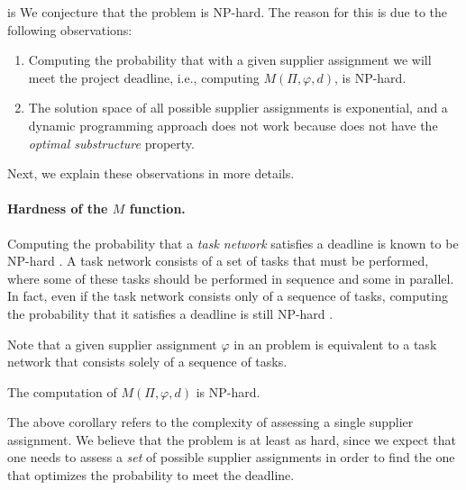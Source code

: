 

is 
We conjecture that the \samd problem is NP-hard. The reason for this is due to the following observations:

\begin{enumerate}
\item Computing the probability that with a given supplier assignment we will meet the project deadline, i.e., computing $M(\Pi, \varphi, d)$, is NP-hard.
\item The solution space of all possible supplier assignments is exponential, and a dynamic programming approach does not work because \samd does not have the \emph{optimal substructure} property. %
\end{enumerate}
Next, we explain these observations in more details. 

\paragraph{Hardness of the $M$ function.}
Computing the probability that a \emph{task network} satisfies a deadline is known to be NP-hard \cite[Theorem 5]{cohen2015estimating}. 
A task network consists of a set of tasks that must be performed, where some of these tasks should be performed in sequence and some in parallel. In fact, even if the task network consists only of a sequence of tasks, computing the probability that it satisfies a deadline is still NP-hard \cite[Lemma 5]{cohen2015estimating}. 

Note that a given supplier assignment $\varphi$ in an \samd problem is equivalent to a task network that consists solely of a sequence of tasks. %
\begin{corollary}
The computation of $M(\Pi, \varphi, d)$ is NP-hard.
\label{cor:m}
\end{corollary}
The above corollary refers to the complexity of assessing a single supplier assignment. We believe that the \samd problem is at least as hard, since we expect that one needs to assess a \emph{set} of possible supplier assignments in order to find the one that optimizes the probability to meet the deadline. %





